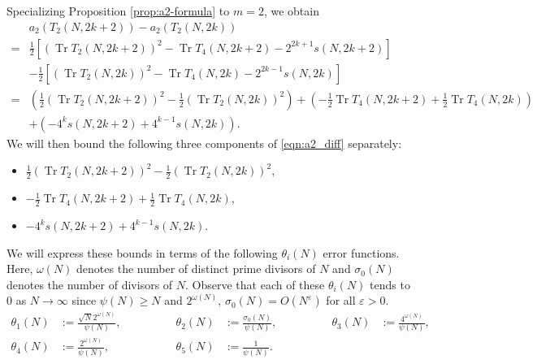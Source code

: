 \documentclass[11pt,letterpaper,reqno]{amsart}
\numberwithin{figure}{section}
\numberwithin{table}{section}
\theoremstyle{definition}
\theoremstyle{plain}
\newcommand{\lrp}[1]{\left(#1\right)}
\newcommand{\lrb}[1]{\left[#1\right]}
\theoremstyle{definition}
\theoremstyle{definition}
\theoremstyle{remark}
\numberwithin{equation}{section}
\DeclareMathOperator{\Tr}{Tr}
\begin{document}
Specializing Proposition \ref{prop:a2-formula} to $m=2$, we obtain
\begin{align}
    &a_2(T_2(N, 2k + 2)) - a_2(T_2(N, 2k))\\ 
    = &\frac{1}{2} 
    \lrb{(\Tr T_2(N, 2k+2))^2-\Tr T_4(N, 2k+2) - 2^{2k+1} s(N, 2k+2) } \\
    & -\frac{1}{2}
    \lrb{(\Tr T_2(N, 2k))^2-\Tr T_4(N, 2k) - 2^{2k-1} s(N,2k)}  \\
    = &\lrp{ \frac12
        (\Tr T_2(N, 2k+2))^2 - \frac12 (\Tr T_2(N, 2k))^2 } 
    + \lrp{ - \frac12 \Tr T_4(N, 2k+2) + \frac12 \Tr T_4(N, 2k)} \\
    &+ \lrp{-  4^{k} s(N, 2k+2) + 4^{k-1}          s(N, 2k)
    }.
    \label{eqn:a2_diff}
\end{align}
We will then bound the following three components of \eqref{eqn:a2_diff} separately:
\begin{itemize}
    \item $\frac{1}{2}(\Tr T_2(N, 2k+2))^2 - \frac{1}{2}(\Tr T_2(N, 2k))^2$,
    \item $-\frac{1}{2}\Tr T_4(N, 2k+2) + \frac{1}{2}\Tr T_4(N, 2k)$,
    \item $-4^{k}s(N, 2k+2) + 4^{k-1}s(N, 2k)$.
\end{itemize}
We will express these bounds in terms of the following $\theta_i(N)$ error functions. Here, $\omega(N)$ denotes the number of distinct prime divisors of $N$ and $\sigma_0(N)$ denotes the number of divisors of $N$. Observe that each of these $\theta_i(N)$ tends to $0$ as $N \rightarrow \infty$ since $\psi(N) \geq N$ and 
$2^{\omega(N)}, \, \sigma_0(N) = O(N^\varepsilon)$ for all $\varepsilon > 0$. 
\begin{equation} \label{eqn:theta-i-def}
    \begin{alignedat}{5}
        \theta_1(N) &:= \frac{ \sqrt{N} 2^{\omega(N)} }{\psi(N)},
        \qquad\qquad
        & \theta_2(N) &:= \frac{\sigma_0(N)}{\psi(N)}, 
        \qquad\qquad 
        & \theta_3(N) &:= \frac{4^{\omega(N)}}{\psi(N)}, 
        \\
        \theta_4(N) &:= \frac{2^{\omega(N)}}{\psi(N)}, 
        \qquad\qquad 
        & \theta_5(N) &:= \frac{1}{\psi(N)}.
        & &
    \end{alignedat}
\end{equation}
\end{document}
